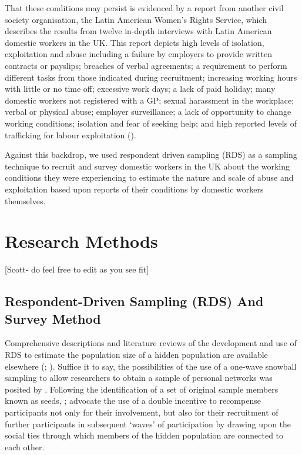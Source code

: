 \documentclass[
  12pt,
  letterpaper,
  DIV=11,
  numbers=noendperiod]{scrartcl}
\theoremstyle{plain}
\theoremstyle{definition}
\begin{document}
That these conditions may persist is evidenced by a report from another
civil society organisation, the Latin American Women's Rights Service,
which describes the results from twelve in-depth interviews with Latin
American domestic workers in the UK. This report depicts high levels of
isolation, exploitation and abuse including a failure by employers to
provide written contracts or payslips; breaches of verbal agreements; a
requirement to perform different tasks from those indicated during
recruitment; increasing working hours with little or no time off;
excessive work days; a lack of paid holiday; many domestic workers not
registered with a GP; sexual harassment in the workplace; verbal or
physical abuse; employer surveillance; a lack of opportunity to change
working conditions; isolation and fear of seeking help; and high
reported levels of trafficking for labour exploitation
(\textcite{latin_american_womens_rights_service_behind_2023}).

Against this backdrop, we used respondent driven sampling (RDS) as a
sampling technique to recruit and survey domestic workers in the UK
about the working conditions they were experiencing to estimate the
nature and scale of abuse and exploitation based upon reports of their
conditions by domestic workers themselves.

\section{Research Methods}\label{research-methods}

{[}Scott- do feel free to edit as you see fit{]}

\subsection{Respondent-Driven Sampling (RDS) And Survey
Method}\label{respondent-driven-sampling-rds-and-survey-method}

Comprehensive descriptions and literature reviews of the development and
use of RDS to estimate the population size of a hidden population are
available elsewhere (\textcite{heckathorn_comment_2011};
\textcite{gile_methods_2018}). Suffice it to say, the possibilities of
the use of a one-wave snowball sampling to allow researchers to obtain a
sample of personal networks was posited by
\textcite{frank_estimating_1994}. Following the identification of a set
of original sample members known as seeds,
\textcite{heckathorn_respondent-driven_1997};
\textcite{heckathorn_respondent-driven_2002} advocate the use of a
double incentive to recompense participants not only for their
involvement, but also for their recruitment of further participants in
subsequent `waves' of participation by drawing upon the social ties
through which members of the hidden population are connected to each
other.
\end{document}
